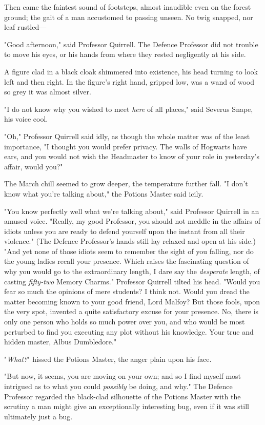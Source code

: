 Then came the faintest sound of footsteps, almost inaudible even on the forest
ground; the gait of a man accustomed to passing unseen. No twig snapped, nor
leaf rustled---

"Good afternoon," said Professor Quirrell. The Defence Professor did not
trouble to move his eyes, or his hands from where they rested negligently at
his side.

A figure clad in a black cloak shimmered into existence, his head turning to
look left and then right. In the figure's right hand, gripped low, was a wand
of wood so grey it was almost silver.

"I do not know why you wished to meet \emph{here} of all places," said Severus
Snape, his voice cool.

"Oh," Professor Quirrell said idly, as though the whole matter was of the least
importance, "I thought you would prefer privacy. The walls of Hogwarts have
ears, and you would not wish the Headmaster to know of your role in yesterday's
affair, would you?"

The March chill seemed to grow deeper, the temperature further fall. "I don't
know what you're talking about," the Potions Master said icily.

"You know perfectly well what we're talking about," said Professor Quirrell in
an amused voice. "Really, my good Professor, you should not meddle in the
affairs of idiots unless you are ready to defend yourself upon the instant from
all their violence." (The Defence Professor's hands still lay relaxed and open
at his side.) "And yet none of those idiots seem to remember the sight of you
falling, nor do the young ladies recall your presence. Which raises the
fascinating question of why you would go to the extraordinary length, I dare
say the \emph{desperate} length, of casting \emph{fifty-two} Memory Charms."
Professor Quirrell tilted his head. "Would you fear so much the opinions of
mere students? I think not. Would you dread the matter becoming known to your
good friend, Lord Malfoy? But those fools, upon the very spot, invented a quite
satisfactory excuse for your presence. No, there is only one person who holds
so much power over you, and who would be most perturbed to find you executing
any plot without his knowledge. Your true and hidden master, Albus Dumbledore."

"\emph{What?}" hissed the Potions Master, the anger plain upon his face.

"But now, it seems, you are moving on your own; and so I find myself most
intrigued as to what you could \emph{possibly} be doing, and why." The Defence
Professor regarded the black-clad silhouette of the Potions Master with the
scrutiny a man might give an exceptionally interesting bug, even if it was
still ultimately just a bug.

